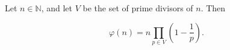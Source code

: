 Let $n \in \mathbb{N}$, and let $V$ be the set of prime divisors of $n$. Then

$$\varphi(n) = n \prod_{p \in V} \left(1 - \frac{1}{p}\right).$$
